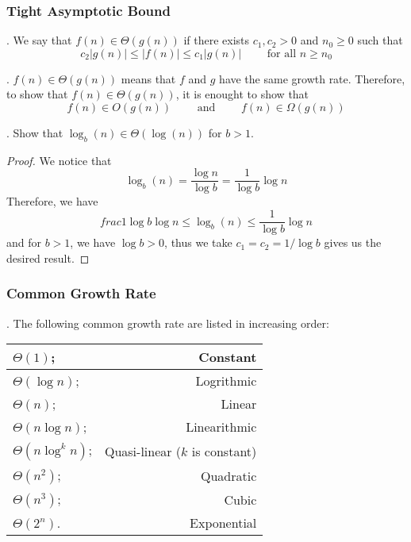 \documentclass{article}
\begin{document}
\subsubsection{Tight Asymptotic Bound}

\begin{deff}.
    We say that $f(n) \in \Theta(g(n))$ if there exists $c_1, c_2 > 0$ and $n_0 \geq 0$ such that 
    \[ c_2 |g(n)| \leq |f(n)| \leq c_1 |g(n)| \qquad \text{ for all } n \geq n_0 \] 
\end{deff}

\begin{comm}[].
    $f(n) \in \Theta(g(n))$ means that $f$ and $g$ have the same growth rate. Therefore, to show that $f(n) \in \Theta(g(n))$, it is enought to show that 
    \[ f(n) \in O(g(n)) \qquad \text{ and } \qquad f(n) \in \Omega(g(n)) \]
\end{comm}

\begin{examplee}[].
    Show that $\log_b(n) \in \Theta(\log(n))$ for $b > 1$. 

    \begin{proof}
        We notice that 
        \[ \log_b(n) = \frac{\log n}{\log b} = \frac{1}{\log b} \log n \]
        Therefore, we have 
        \[ frac{1}{\log b} \log n \leq \log_b(n) \leq \frac{1}{\log b} \log n \] 
        and for $b > 1$, we have $\log b > 0$, thus we take $c_1 = c_2 = 1/ \log b$ gives us the desired result. 
    \end{proof}
\end{examplee}

\subsubsection{Common Growth Rate}

\begin{thmm}[].
    The following common growth rate are listed in increasing order: 
    \begin{center}
        \begin{tabular}{| l | r |} \hline 
            $\Theta(1)$; & Constant \\ \hline 
            $\Theta(\log n)$; & Logrithmic \\ \hline
            $\Theta(n)$; & Linear \\ \hline
            $\Theta(n \log n)$; & Linearithmic \\ \hline
            $\Theta(n \log^k n)$;  & Quasi-linear ($k$ is constant) \\ \hline
            $\Theta(n^2)$; & Quadratic \\ \hline
            $\Theta(n^3)$; & Cubic \\ \hline
            $\Theta(2^n)$. & Exponential \\ \hline
        \end{tabular}
    \end{center}
\end{thmm}
\end{document}
